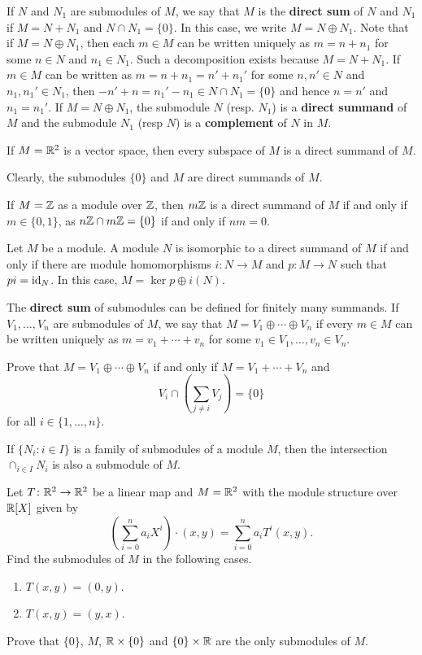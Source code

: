 If $N$ and $N_1$ are submodules of $M$, we say that $M$ is the \textbf{direct sum} of $N$ and $N_1$
if $M=N+N_1$ and $N\cap N_1=\{0\}$. In this case, we write $M=N\oplus N_1$. Note that if
$M=N\oplus N_1$, then each $m\in M$ can be written uniquely as $m=n+n_1$ for some
 $n\in N$ and $n_1\in N_1$. 
Such a decomposition exists because $M=N+N_1$. If $m\in M$ can be written as 
$m=n+n_1=n'+n_1'$ for some $n,n'\in N$ and $n_1,n_1'\in N_1$, then 
$-n'+n=n_1'-n_1\in N\cap N_1=\{0\}$ and hence $n=n'$ and $n_1=n_1'$. If $M=N\oplus N_1$, the submodule
$N$ (resp. $N_1$) is a \textbf{direct summand} of $M$ and the submodule $N_1$ (resp $N$) is a \textbf{complement} of $N$ 
in $M$.   	

\begin{example}
If $M=\mathbb{R}^2$ is a vector space, then every subspace of $M$ is a direct summand of $M$.
\end{example}

Clearly, the submodules $\{0\}$ and $M$ are direct summands of $M$.

\begin{example}
If $M=\mathbb{Z}$ as a module over $\mathbb{Z}$, then $m\mathbb{Z}$ is a direct summand of $M$ if and only if 
$m\in\{0,1\}$, as $n\mathbb{Z}\cap m\mathbb{Z}=\{0\}$ if and only if $nm=0$.
\end{example}

\begin{exercise}
\label{xca:projector}
Let $M$ be a module. 
A module $N$ is isomorphic to a direct summand of $M$ if and only if
there are module homomorphisms $i\colon N\to M$ and $p\colon M\to N$ 
such that $pi=\operatorname{id}_N$. In this case, $M=\ker p\oplus i(N)$.  
\end{exercise}

The \textbf{direct sum} of submodules can be defined for finitely many summands. 
If $V_1,\dots,V_n$ are submodules of $M$, we say that $M=V_1\oplus\cdots\oplus V_n$ 
if every $m\in M$ can be written uniquely as $m=v_1+\cdots+v_n$ for some $v_1\in V_1,\dots,v_n\in V_n$. 

\begin{exercise}
Prove that $M=V_1\oplus\cdots\oplus V_n$ if and only if 
$M=V_1+\cdots+V_n$ and 
\[
V_i\cap\left(\sum_{j\ne i}V_j\right)=\{0\}
\]	
for all $i\in\{1,\dots,n\}$.
\end{exercise}

If $\{N_i:i\in I\}$ is a family of submodules of a module $M$, then the intersection  
$\cap_{i\in I}N_i$ is also a submodule of $M$.

\begin{exercise}
\label{xca:submodules}
Let $T\colon\mathbb{R}^2\to\mathbb{R}^2$ be a linear map and $M=\mathbb{R}^2$ with the module structure 
over $\mathbb{R}[X]$ given by
\[
\left(\sum_{i=0}^n a_iX^i\right)\cdot (x,y)=\sum_{i=0}^n a_iT^i(x,y).
\]
Find the submodules of $M$ in the following cases. 
\begin{enumerate}
    \item $T(x,y)=(0,y)$.
    \item $T(x,y)=(y,x)$.
\end{enumerate}
Prove that 
$\{0\}$, $M$, $\mathbb{R}\times\{0\}$ and $\{0\}\times\mathbb{R}$ 
are the only submodules of $M$.
\end{exercise}

